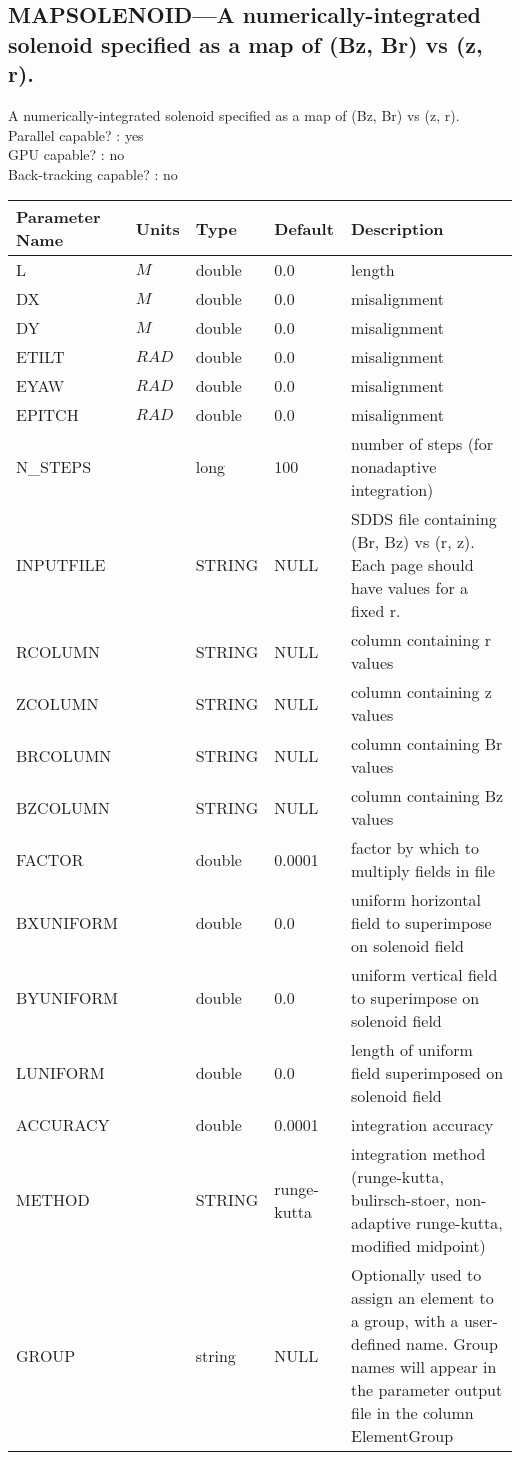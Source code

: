 \subsection{MAPSOLENOID---A numerically-integrated solenoid specified as a map of (Bz, Br) vs (z, r).}
A numerically-integrated solenoid specified as a map of (Bz, Br) vs (z, r).
\\
Parallel capable? : yes\\
GPU capable? : no\\
Back-tracking capable? : no\\
\begin{tabular}{|l|l|l|l|p{\descwidth}|} \hline
Parameter Name & Units & Type & Default & Description \\ \hline 
L & $M$ & double &  0.0 & length  \\ \hline 
DX & $M$ & double &  0.0 & misalignment  \\ \hline 
DY & $M$ & double &  0.0 & misalignment  \\ \hline 
ETILT & $RAD$ & double &  0.0 & misalignment  \\ \hline 
EYAW & $RAD$ & double &  0.0 & misalignment  \\ \hline 
EPITCH & $RAD$ & double &  0.0 & misalignment  \\ \hline 
N\_STEPS &  & long &   100             & number of steps (for nonadaptive integration)  \\ \hline 
INPUTFILE &  & STRING &   NULL            & SDDS file containing (Br, Bz) vs (r, z).  Each page should have values for a fixed r.  \\ \hline 
RCOLUMN &  & STRING &   NULL            & column containing r values  \\ \hline 
ZCOLUMN &  & STRING &   NULL            & column containing z values  \\ \hline 
BRCOLUMN &  & STRING &   NULL            & column containing Br values  \\ \hline 
BZCOLUMN &  & STRING &   NULL            & column containing Bz values  \\ \hline 
FACTOR &  & double &   0.0001 & factor by which to multiply fields in file  \\ \hline 
BXUNIFORM &  & double &  0.0 & uniform horizontal field to superimpose on solenoid field  \\ \hline 
BYUNIFORM &  & double &  0.0 & uniform vertical field to superimpose on solenoid field  \\ \hline 
LUNIFORM &  & double &  0.0 & length of uniform field superimposed on solenoid field  \\ \hline 
ACCURACY &  & double &   0.0001 & integration accuracy  \\ \hline 
METHOD & $ $ & STRING &   runge-kutta     & integration method (runge-kutta, bulirsch-stoer, non-adaptive runge-kutta, modified midpoint)  \\ \hline 
GROUP &  & string & NULL & Optionally used to assign an element to a group, with a user-defined name.  Group names will appear in the parameter output file in the column ElementGroup  \\ \hline 
\end{tabular}

